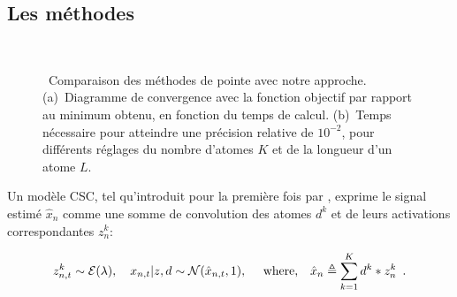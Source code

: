 \subsection*{Les méthodes}

\begin{figure}[htb]
    \centering
      \\
    \caption[]{~Comparaison des méthodes de pointe avec notre approche. (a)~Diagramme de convergence avec la fonction objectif par rapport au minimum obtenu, en fonction du temps de calcul. (b)~Temps nécessaire pour atteindre une précision relative de $10^{-2}$, pour différents réglages du nombre d'atomes $K$ et de la longueur d'un atome $L$.}
    \label{fig:sommaire:convergence}
\end{figure}

Un modèle CSC, tel qu'introduit pour la première fois par \citet{grosse2012shift}, exprime le signal estimé $\hat{x}_n$ comme une somme de convolution des atomes $d^k$  et de leurs activations correspondantes $z_n^k$:

\begin{align}
z_{n,t}^k \sim {\cal E}(\lambda),
\quad x_{n,t} | z, d \sim {\cal N}( \hat{x}_{n,t},1 ),
\quad \text{ where,}
\quad \hat{x}_n \triangleq \sum_{k=1}^{K}d^{k} * z_{n}^{k} \enspace .
\label{eqn:sommaire:csc_prob}
\end{align}

